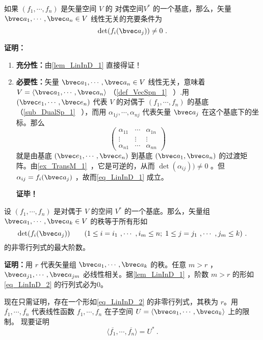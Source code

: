 \begin{lemma}{}\label{lem_LinInD_2}
如果 $(f_1,\cdots,f_n)$ 是矢量空间 $V$ 的 对偶空间$V^*$ 的一个基底，那么，矢量 $\bvec a_1,\cdots,\bvec a_n\in V$ 线性无关的充要条件为
\begin{equation}\label{eq_LinInD_1}
\det(f_i(\bvec a_j))\neq 0~.
\end{equation}
\end{lemma}
\textbf{证明：} \begin{enumerate}
\item \textbf{充分性：}由\autoref{lem_LinInD_1} 直接得证！
\item \textbf{必要性：}矢量 $\bvec a_1,\cdots,\bvec a_n\in V$ 线性无关，意味着 $V=\langle\bvec a_1,\cdots,\bvec a_n\rangle$ （\autoref{def_VecSpn_1}~ ）.用 $(\bvec e_1,\cdots,\bvec e_n)$ 代表 $V$ 的对偶于 $(f_1,\cdots,f_n)$ 的基底（\autoref{sub_DualSp_1}~ ），而用 $\alpha_{1j},\cdots,\alpha_{nj}$ 代表矢量 $\bvec a_j$ 在这个基底下的坐标。那么
\begin{equation}
\begin{pmatrix}
\alpha_{11}&\cdots&\alpha_{1n}\\
\vdots&\vdots&\vdots\\
\alpha_{n1}&\cdots&\alpha_{nn}
\end{pmatrix}~
\end{equation}
就是由基底 $(\bvec e_1,\cdots,\bvec e_n)$ 到基底 $(\bvec a_1,\bvec a_n)$ 的过渡矩阵。由\autoref{ex_TransM_1}~，它是可逆的，从而 $\det(\alpha_{ij}))\neq0$ 。但 $\alpha_{ij}=f_i(\bvec a_j)$ ，故而\autoref{eq_LinInD_1} 成立。

\textbf{证毕！} 
\end{enumerate}
\begin{theorem}{}
设 $(f_1,\cdots,f_n)$ 是对偶于 $V$ 的空间 $V^*$ 的一个基底。那么，矢量组 $\bvec a_1,\cdots,\bvec a_k\in V$ 的秩等于所有形如
\begin{equation}\label{eq_LinInD_2}
\det(f_i(\bvec a_j))\qquad (1\leq i=i_1~,\cdots~ ,i_m\leq n;\;1\leq j=j_1~,\cdots~,j_m\leq k)~.
\end{equation}
的非零行列式的最大阶数。
\end{theorem}
\textbf{证明：}用 $r$ 代表矢量组 $\bvec a_1,\cdots,\bvec a_k$ 的秩。任意 $m>r$ ，$\bvec a_{j1},\cdots,\bvec a_{jm}$ 必线性相关。据\autoref{lem_LinInD_1} ，阶数 $m>r$ 的形如\autoref{eq_LinInD_2} 的行列式必为0。

现在只需证明，存在一个形如\autoref{eq_LinInD_2} 的非零行列式，其秩为 $r$。用 $\overline{f_1},\cdots,\overline{f_n}$ 代表线性函数 $f_1,\cdots,f_n$ 在子空间 $U=\langle\bvec a_1,\cdots,\bvec a_k\rangle$ 上的限制。
现要证明
\begin{equation}\label{eq_LinInD_3}
\langle\overline{f_1},\cdots,\overline{f_n}\rangle=U^*~.
\end{equation}

